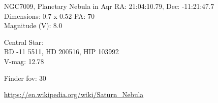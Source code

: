 \begin{block}{NGC7009, Planetary Nebula in Aqr}
    RA: 21:04:10.79, Dec: -11:21:47.7 \\ 
    Dimensions: 0.7 x 0.52 PA: 70 \\ 
    Magnitude (V): 8.0


    Central Star: \\ 
      \hspace{1em}BD -11 5511, HD 200516, HIP 103992 \\ 
      \hspace{1em}V-mag: 12.78 


    Finder fov: 30 

    \url{https://en.wikipedia.org/wiki/Saturn_Nebula} 
\end{block}